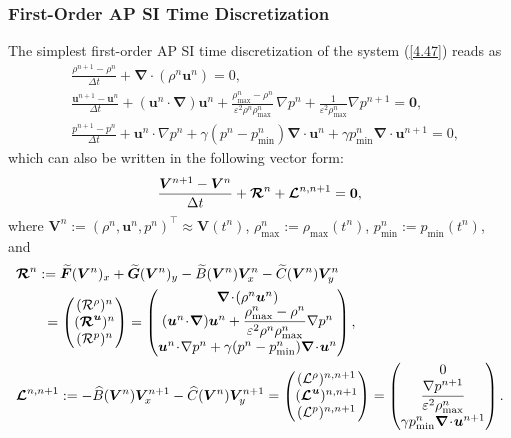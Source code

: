 \documentclass[preprint,12pt]{elsarticle}
\def\bnabla{\bm{\nabla}}
\newcommand{\dt}{\Delta t}
\newcommand{\mF}{\bm{F}}
\newcommand{\mG}{\bm{G}}
\newcommand{\ve}{\varepsilon}
\newcommand\eref[1]{(\ref{#1})}
\begin{document}
\subsubsection{First-Order AP SI Time Discretization}
The simplest first-order AP SI time discretization of the system \eref{4.47} reads as
\begin{equation}
	\begin{aligned}
		&\frac{\rho^{n+1}-\rho^n}{\dt}+\bnabla\!\cdot\!(\rho^n\bm u^n)=0,\\
		&\frac{\bm u^{n+1}-\bm u^n}{\dt}+(\bm u^n\!\cdot\!\bnabla)\bm u^n+\frac{\rho_{\max}^n-\rho^n}{\ve^2\rho^n\rho_{\max}^n}\,\nabla p^n+
		\frac{1}{\ve^2\rho_{\max}^n}\nabla p^{n+1}=\bm0,\\
		&\frac{p^{n+1}-p^n}{\dt}+\bm u^n\!\cdot\!\nabla p^n+\gamma(p^n-p_{\min}^n)\bnabla\!\cdot\!\bm u^n+\gamma p_{\min}^n
		\bnabla\!\cdot\!\bm u^{n+1}=0,
	\end{aligned}
	\label{4.8}
\end{equation}
which can also be written in the following vector form:
\begin{equation*}
	\frac{\bm V^{n+1}-\bm V^n}{\dt}+\bm{{\cal R}}^n+\bm{{\cal L}}^{n,n+1}=\bm0,
\end{equation*}
where $\bm V^n:=(\rho^n,\bm u^n,p^n)^\top\approx\bm V(t^n)$, $\rho_{\max}^n:=\rho_{\max}(t^n)$, $p_{\min}^n:=p_{\min}(t^n)$, and 
\begin{align}
	&\begin{aligned}
		\bm{{\cal R}}^n&:=\widetilde{\mF}(\bm V^n)_x+\widetilde{\mG}(\bm V^n)_y-\widetilde B(\bm V^n)\bm V_x^n-\widetilde C(\bm V^n)\bm V_y^n\\
		&\hspace*{0.15cm}=\begin{pmatrix}({\cal R}^\rho)^n\\(\bm{{\cal R}}^{\bm u})^n\\({\cal R}^p)^n\end{pmatrix}=
		\begin{pmatrix}\bnabla\!\cdot\!(\rho^n\bm u^n)\\(\bm u^n\!\cdot\!\bnabla)\bm u^n+\dfrac{\rho_{\max}^n-\rho^n}{\ve^2\rho^n\rho_{\max}^n}
			\nabla p^n\\[1.5ex]
			\bm u^n\!\cdot\!\nabla p^n+\gamma(p^n-p_{\min}^n)\bnabla\!\cdot\!\bm u^n\end{pmatrix},
	\end{aligned}\label{3.12f}\\
	&\bm{{\cal L}}^{n,n+1}:=-\widehat B(\bm V^n)\bm V_x^{n+1}-\widehat C(\bm V^n)\bm V_y^{n+1}=
	\begin{pmatrix}({\cal L}^\rho)^{n,n+1}\\(\bm{{\cal L}}^{\bm u})^{n,n+1}\\({\cal L}^p)^{n,n+1}\end{pmatrix}
	=\begin{pmatrix}0\\\dfrac{\nabla p^{n+1}}{\ve^2\rho_{\max}^n}\\[1.5ex]
		\gamma p_{\min}^n\bnabla\!\cdot\!\bm u^{n+1}\end{pmatrix}.\label{3.13f}
\end{align}
\end{document}

